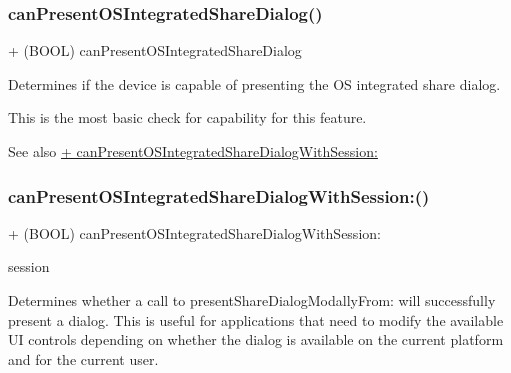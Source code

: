 \subsubsection{\texorpdfstring{can\+Present\+O\+S\+Integrated\+Share\+Dialog()}{canPresentOSIntegratedShareDialog()}\hspace{0.1cm}{\footnotesize\ttfamily [5/5]}}
{\footnotesize\ttfamily + (B\+O\+OL) can\+Present\+O\+S\+Integrated\+Share\+Dialog \begin{DoxyParamCaption}{ }\end{DoxyParamCaption}}

Determines if the device is capable of presenting the OS integrated share dialog.

This is the most basic check for capability for this feature.

\begin{DoxySeeAlso}{See also}
\hyperlink{interfaceFBDialogs_a268b4ee8ee491e006770a51cefa36eeb}{+ can\+Present\+O\+S\+Integrated\+Share\+Dialog\+With\+Session\+:} 
\end{DoxySeeAlso}
\mbox{\label{interfaceFBDialogs_a268b4ee8ee491e006770a51cefa36eeb}} 
\subsubsection{\texorpdfstring{can\+Present\+O\+S\+Integrated\+Share\+Dialog\+With\+Session\+:()}{canPresentOSIntegratedShareDialogWithSession:()}\hspace{0.1cm}{\footnotesize\ttfamily [1/5]}}
{\footnotesize\ttfamily + (B\+O\+OL) can\+Present\+O\+S\+Integrated\+Share\+Dialog\+With\+Session\+: \begin{DoxyParamCaption}\item[{(\hyperlink{interfaceFBSession}{F\+B\+Session} $\ast$)}]{session }\end{DoxyParamCaption}}

Determines whether a call to present\+Share\+Dialog\+Modally\+From\+: will successfully present a dialog. This is useful for applications that need to modify the available UI controls depending on whether the dialog is available on the current platform and for the current user.


